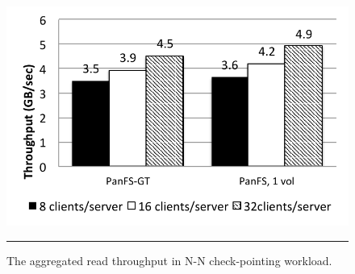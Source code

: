 \begin{figure}[t]  %
\centerline{\includegraphics[scale=0.7]{./figs/checkpointing_read}}
\vspace{10pt}
\caption{\footnotesize
\textsf{
The aggregated read throughput in N-N check-pointing workload.
}
}
\hrule
\label{graph:checkpoint_read}
\end{figure}       %


